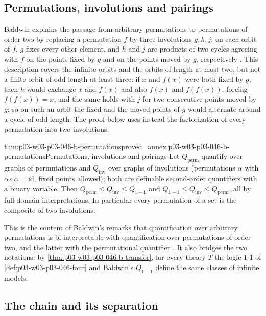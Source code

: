 \subsection{Permutations, involutions and pairings}
\label{sec:p03-w03-p03-046-b-permutations}

Baldwin explains the passage from arbitrary permutations to permutations
of order two by replacing a permutation \(f\) by three involutions
\(g,h,j\): on each orbit of \(f\), \(g\) fixes every other element, and
\(h\) and \(j\) are products of two-cycles agreeing with \(f\) on the
points fixed by \(g\) and on the points moved by \(g\), respectively
\cite[p.~445]{Baldwin1985DSOQ}. This description covers the infinite
orbits and the orbits of length at most two, but not a finite orbit of odd
length at least three: if \(x\) and \(f(x)\) were both fixed by \(g\), then
\(h\) would exchange \(x\) and \(f(x)\) and also \(f(x)\) and \(f(f(x))\),
forcing \(f(f(x))=x\), and the same holds with \(j\) for two consecutive
points moved by \(g\); so on such an orbit the fixed and the moved points
of \(g\) would alternate around a cycle of odd length. The proof below uses
instead the factorization of every permutation into two involutions.

\begin{hbtheorem}{thm:p03-w03-p03-046-b-permutations}{proved=annex:p03-w03-p03-046-b-permutations}{Permutations, involutions and pairings}
Let \(Q_{\mathrm{perm}}\) quantify over graphs of permutations and
\(Q_{\mathrm{inv}}\) over graphs of involutions (permutations \(\alpha\)
with \(\alpha\circ\alpha=\mathrm{id}\), fixed points allowed); both are
definable second-order quantifiers with a binary variable. Then
\(Q_{\mathrm{perm}}\le Q_{\mathrm{inv}}\le Q_{1-1}\) and
\(Q_{1-1}\le Q_{\mathrm{inv}}\le Q_{\mathrm{perm}}\), all by full-domain
interpretations. In particular every permutation of a set is the
composite of two involutions.
\end{hbtheorem}

This is the content of Baldwin's remarks that quantification over
arbitrary permutations is bi-interpretable with quantification over
permutations of order two, and the latter with the permutational
quantifier \cite[pp.~445, 449]{Baldwin1985DSOQ}. It also bridges the two
notations: by \cref{thm:p03-w03-p03-046-b-transfer}, for every theory \(T\)
the logic \(\text{1-1}\) of \cref{def:p03-w03-p03-046-four} and
Baldwin's \(Q_{1-1}\) define the same classes of infinite models.

\subsection{The chain and its separation}
\label{sec:p03-w03-p03-046-b-chain}

